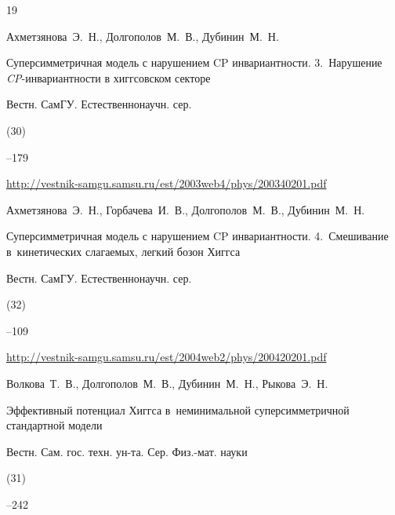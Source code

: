 \begin{thebibliography}{19}






\by Ахметзянова~Э.~Н., Долгополов~М.~В., Дубинин~М.~Н.

\paper Суперсимметричная модель с нарушением CP инвариантности. 3.~Нарушение {\it CP}-инвариантности в хиггсовском секторе

\jour Вестн. СамГУ. Естественнонаучн. сер.


(30)

--179

\elink \url{http://vestnik-samgu.samsu.ru/est/2003web4/phys/200340201.pdf}




\by Ахметзянова~Э.~Н., Горбачева~И.~В., Долгополов~М.~В., Дубинин~М.~Н.

\paper Суперсимметричная модель с нарушением CP инвариантности. 4.~Смешивание в~кинетических слагаемых, легкий бозон Хиггса

\jour Вестн. СамГУ. Естественнонаучн. сер.


(32)

--109

\elink \url{http://vestnik-samgu.samsu.ru/est/2004web2/phys/200420201.pdf}




\by Волкова~Т.~В., Долгополов~М.~В., Дубинин~М.~Н., Рыкова~Э.~Н.

\paper Эффективный потенциал Хиггса в~неминимальной суперсимметричной стандартной модели

\jour  Вестн. Сам. гос. техн. ун-та. Сер. Физ.-мат. науки


(31)

--242








\end{thebibliography}
